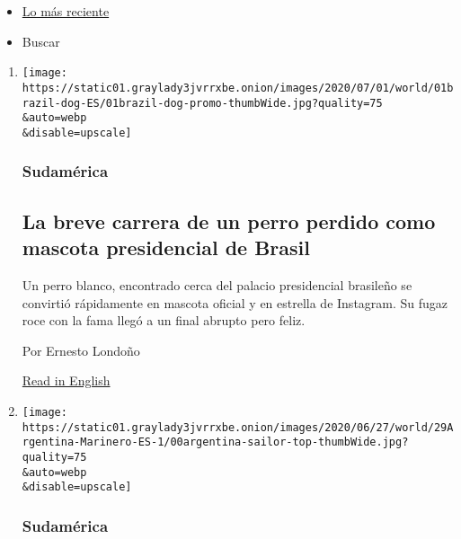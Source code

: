 \begin{itemize}
\tightlist
\item
  \protect\hyperlink{stream-panel}{Lo más reciente}
\item
  Buscar
\end{itemize}

\begin{enumerate}
\def\labelenumi{\arabic{enumi}.}
\item
  \href{/es/2020/07/01/espanol/america-latina/perro-bolsonaro.html}{}

  \texttt{[image: https://static01.graylady3jvrrxbe.onion/images/2020/07/01/world/01brazil-dog-ES/01brazil-dog-promo-thumbWide.jpg?quality=75\\\&auto=webp\\\&disable=upscale]}

  \hypertarget{sudamuxe9rica-1}{%
  \subsubsection{Sudamérica}\label{sudamuxe9rica-1}}

  \hypertarget{la-breve-carrera-de-un-perro-perdido-como-mascota-presidencial-de-brasil}{%
  \subsection{La breve carrera de un perro perdido como mascota
  presidencial de
  Brasil}\label{la-breve-carrera-de-un-perro-perdido-como-mascota-presidencial-de-brasil}}

  Un perro blanco, encontrado cerca del palacio presidencial brasileño
  se convirtió rápidamente en mascota oficial y en estrella de
  Instagram. Su fugaz roce con la fama llegó a un final abrupto pero
  feliz.

  Por Ernesto Londoño

  \href{https://www.nytimes3xbfgragh.onion/2020/07/01/world/americas/bolsonaro-dog-adoption.html}{Read
  in English}
\item
  \href{/es/2020/06/29/espanol/america-latina/coronavirus-argentina-marino.html}{}

  \texttt{[image: https://static01.graylady3jvrrxbe.onion/images/2020/06/27/world/29Argentina-Marinero-ES-1/00argentina-sailor-top-thumbWide.jpg?quality=75\\\&auto=webp\\\&disable=upscale]}

  \hypertarget{sudamuxe9rica-2}{%
  \subsubsection{Sudamérica}\label{sudamuxe9rica-2}}


\end{enumerate}
